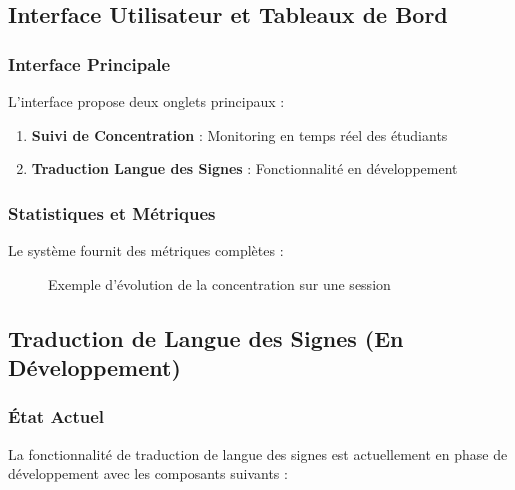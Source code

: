 \documentclass[12pt,a4paper]{article}
\begin{document}
\subsection{Interface Utilisateur et Tableaux de Bord}

\subsubsection{Interface Principale}
L'interface propose deux onglets principaux :

\begin{enumerate}
    \item \textbf{Suivi de Concentration} : Monitoring en temps réel des étudiants
    \item \textbf{Traduction Langue des Signes} : Fonctionnalité en développement
\end{enumerate}

\subsubsection{Statistiques et Métriques}
Le système fournit des métriques complètes :

\begin{figure}[H]
\centering
{}
\caption{Exemple d'évolution de la concentration sur une session}
\end{figure}

\subsection{Traduction de Langue des Signes (En Développement)}

\subsubsection{État Actuel}
La fonctionnalité de traduction de langue des signes est actuellement en phase de développement avec les composants suivants :
\end{document}
